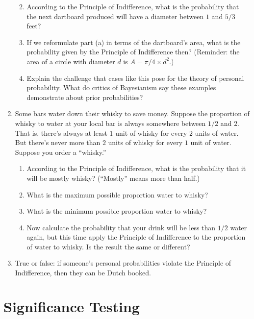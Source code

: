 \documentclass[justified]{tufte-book}
\providecommand{\tightlist}{%
  \setlength{\itemsep}{0pt}\setlength{\parskip}{0pt}}
\theoremstyle{definition}
\theoremstyle{definition}
\theoremstyle{definition}
\theoremstyle{definition}
\theoremstyle{remark}
\begin{document}
\begin{enumerate}
  \begin{enumerate}
  \def\labelenumii{\alph{enumii}.}
  \tightlist
  \item
    According to the Principle of Indifference, what is the probability that the next dartboard produced will have a diameter between \(1\) and \(5/3\) feet?
  \item
    If we reformulate part (a) in terms of the dartboard's area, what is the probability given by the Principle of Indifference then? (Reminder: the area of a circle with diameter \(d\) is \(A = \pi/4 \times d^2\).)
  \item
    Explain the challenge that cases like this pose for the theory of personal probability. What do critics of Bayesianism say these examples demonstrate about prior probabilities?
  \end{enumerate}
\item
  Some bars water down their whisky to save money. Suppose the proportion of whisky to water at your local bar is always somewhere between \(1/2\) and \(2\). That is, there's always at least \(1\) unit of whisky for every \(2\) units of water. But there's never more than \(2\) units of whisky for every \(1\) unit of water. Suppose you order a ``whisky.''

  \begin{enumerate}
  \def\labelenumii{\alph{enumii}.}
  \tightlist
  \item
    According to the Principle of Indifference, what is the probability that it will be mostly whisky? (``Mostly'' means more than half.)
  \item
    What is the maximum possible proportion water to whisky?
  \item
    What is the minimum possible proportion water to whisky?
  \item
    Now calculate the probability that your drink will be less than \(1/2\) water again, but this time apply the Principle of Indifference to the proportion of water to whisky. Is the result the same or different?
  \end{enumerate}
\item
  True or false: if someone's personal probabilities violate the Principle of Indifference, then they can be Dutch booked.
\end{enumerate}

\hypertarget{significance-testing}{%
\chapter{Significance Testing}\label{significance-testing}}
\end{document}
